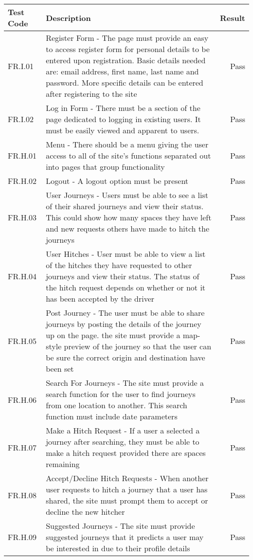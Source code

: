 \begin{longtable}{| l | p{9cm} | r |}
\hline
Test Code & Description & Result \\
\hline
FR.I.01 & Register Form - The page must provide an easy to access register form for personal details to be entered upon registration. Basic details needed are: email address, first name, last name and password. More specific details can be entered after registering to the site & Pass \\
\hline
FR.I.02 & Log in Form - There must be a section of the page dedicated to logging in existing users. It must be easily viewed and apparent to users. & Pass \\
\hline
FR.H.01 & Menu - There should be a menu giving the user access to all of the site's functions separated out into pages that group functionality & Pass \\
\hline
FR.H.02 & Logout - A logout option must be present & Pass \\
\hline
FR.H.03 & User Journeys - Users must be able to see a list of their shared journeys and view their status. This could show how many spaces they have left and new requests others have made to hitch the journeys & Pass \\
\hline
FR.H.04 & User Hitches - User must be able to view a list of the hitches they have requested to other journeys and view their status. The status of the hitch request depends on whether or not it has been accepted by the driver & Pass \\
\hline
FR.H.05 & Post Journey - The user must be able to share journeys by posting the details of the journey up on the page. the site must provide a map-style preview of the journey so that the user can be sure the correct origin and destination have been set & Pass \\
\hline
FR.H.06 &Search For Journeys - The site must provide a search function for the user to find journeys from one location to another. This search function must include date parameters & Pass \\
\hline
FR.H.07 & Make a Hitch Request - If a user a selected a journey after searching, they must be able to make a hitch request provided there are spaces remaining & Pass \\
\hline
FR.H.08 &  Accept/Decline Hitch Requests - When another user requests to hitch a journey that a user has shared, the site must prompt them to accept or decline the new hitcher & Pass \\
\hline
FR.H.09 & Suggested Journeys - The site must provide suggested journeys that it predicts a user may be interested in due to their profile details & Pass \\

\end{longtable}
